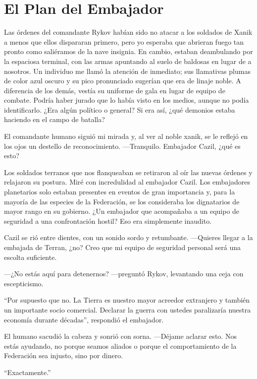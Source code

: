 \chapter{El Plan del Embajador}\label{sec:el-plan-del-embajador}

Las órdenes del comandante Rykov habían sido no atacar a los soldados de Xanik a menos que ellos dispararan primero, pero yo esperaba que abrieran fuego tan pronto como saliéramos de la nave insignia. En cambio, estaban deambulando por la espaciosa terminal, con las armas apuntando al suelo de baldosas en lugar de a nosotros. Un individuo me llamó la atención de inmediato; sus llamativas plumas de color azul oscuro y su pico pronunciado sugerían que era de linaje noble. A diferencia de los demás, vestía su uniforme de gala en lugar de equipo de combate. Podría haber jurado que lo había visto en los medios, aunque no podía identificarlo. ¿Era algún político o general? Si era así, ¿qué demonios estaba haciendo en el campo de batalla?

El comandante humano siguió mi mirada y, al ver al noble xanik, se le reflejó en los ojos un destello de reconocimiento. —Tranquilo. Embajador Cazil, ¿qué es esto?

Los soldados terranos que nos flanqueaban se retiraron al oír las nuevas órdenes y relajaron su postura. Miré con incredulidad al embajador Cazil. Los embajadores planetarios solo estaban presentes en eventos de gran importancia y, para la mayoría de las especies de la Federación, se los consideraba los dignatarios de mayor rango en su gobierno. ¿Un embajador que acompañaba a un equipo de seguridad a una confrontación hostil? Eso era simplemente inaudito.

Cazil se rió entre dientes, con un sonido sordo y retumbante. —Quieres llegar a la embajada de Terran, ¿no? Creo que mi equipo de seguridad personal será una escolta suficiente.

—¿No estás aquí para detenernos? —preguntó Rykov, levantando una ceja con escepticismo.

``Por supuesto que no. La Tierra es nuestro mayor acreedor extranjero y también un importante socio comercial. Declarar la guerra con ustedes paralizaría nuestra economía durante décadas'', respondió el embajador.

El humano sacudió la cabeza y sonrió con sorna. —Déjame aclarar esto. Nos estás ayudando, no porque seamos aliados o porque el comportamiento de la Federación sea injusto, sino por dinero.

``Exactamente.''

